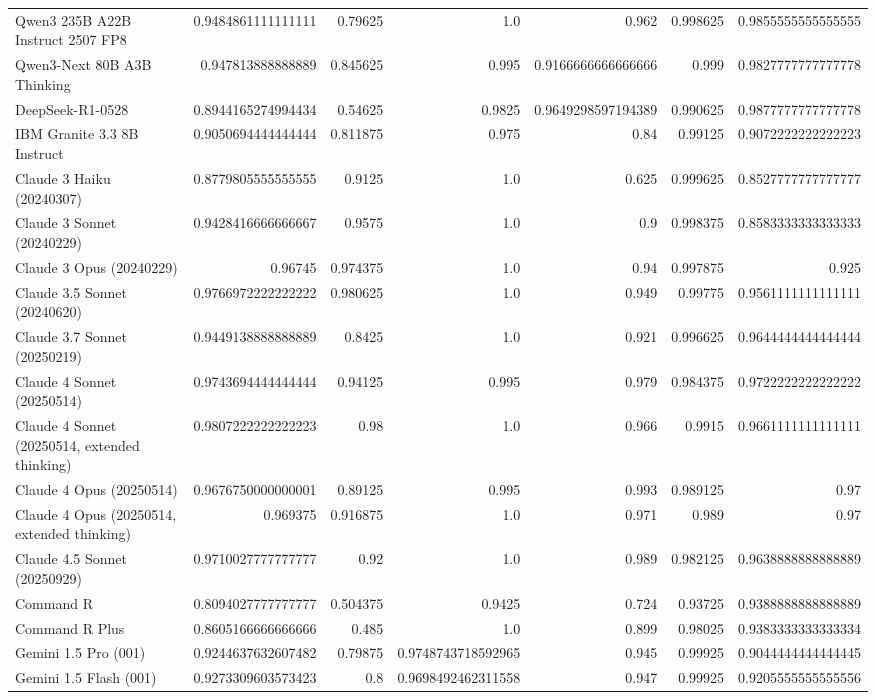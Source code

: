 \begin{table}[htp]
{\begin{tabular}{lrrrrrr}
Qwen3 235B A22B Instruct 2507 FP8 & 0.9484861111111111 & 0.79625 & 1.0 & 0.962 & 0.998625 & 0.9855555555555555 \\
Qwen3-Next 80B A3B Thinking & 0.947813888888889 & 0.845625 & 0.995 & 0.9166666666666666 & 0.999 & 0.9827777777777778 \\
DeepSeek-R1-0528 & 0.8944165274994434 & 0.54625 & 0.9825 & 0.9649298597194389 & 0.990625 & 0.9877777777777778 \\
IBM Granite 3.3 8B Instruct & 0.9050694444444444 & 0.811875 & 0.975 & 0.84 & 0.99125 & 0.9072222222222223 \\
Claude 3 Haiku (20240307) & 0.8779805555555555 & 0.9125 & 1.0 & 0.625 & 0.999625 & 0.8527777777777777 \\
Claude 3 Sonnet (20240229) & 0.9428416666666667 & 0.9575 & 1.0 & 0.9 & 0.998375 & 0.8583333333333333 \\
Claude 3 Opus (20240229) & 0.96745 & 0.974375 & 1.0 & 0.94 & 0.997875 & 0.925 \\
Claude 3.5 Sonnet (20240620) & 0.9766972222222222 & 0.980625 & 1.0 & 0.949 & 0.99775 & 0.9561111111111111 \\
Claude 3.7 Sonnet (20250219) & 0.9449138888888889 & 0.8425 & 1.0 & 0.921 & 0.996625 & 0.9644444444444444 \\
Claude 4 Sonnet (20250514) & 0.9743694444444444 & 0.94125 & 0.995 & 0.979 & 0.984375 & 0.9722222222222222 \\
Claude 4 Sonnet (20250514, extended thinking) & 0.9807222222222223 & 0.98 & 1.0 & 0.966 & 0.9915 & 0.9661111111111111 \\
Claude 4 Opus (20250514) & 0.9676750000000001 & 0.89125 & 0.995 & 0.993 & 0.989125 & 0.97 \\
Claude 4 Opus (20250514, extended thinking) & 0.969375 & 0.916875 & 1.0 & 0.971 & 0.989 & 0.97 \\
Claude 4.5 Sonnet (20250929) & 0.9710027777777777 & 0.92 & 1.0 & 0.989 & 0.982125 & 0.9638888888888889 \\
Command R & 0.8094027777777777 & 0.504375 & 0.9425 & 0.724 & 0.93725 & 0.9388888888888889 \\
Command R Plus & 0.8605166666666666 & 0.485 & 1.0 & 0.899 & 0.98025 & 0.9383333333333334 \\
Gemini 1.5 Pro (001) & 0.9244637632607482 & 0.79875 & 0.9748743718592965 & 0.945 & 0.99925 & 0.9044444444444445 \\
Gemini 1.5 Flash (001) & 0.9273309603573423 & 0.8 & 0.9698492462311558 & 0.947 & 0.99925 & 0.9205555555555556 \\

\end{tabular}}
\end{table}
